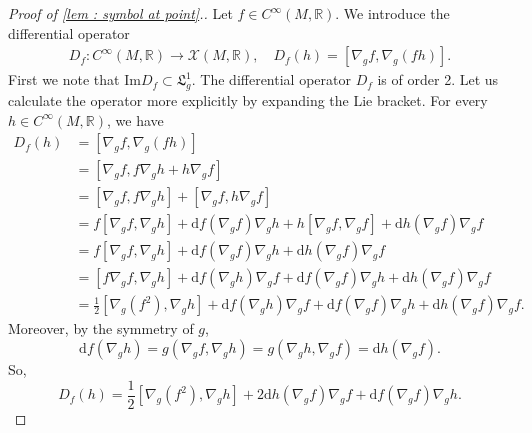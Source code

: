 \documentclass[10pt]{article}
\newcommand{\R}{{\mathbb R}}
\newcommand{\Chi}{{\mathcal X}}
\newcommand{\LL}{{\mathfrak L}}
\begin{document}
\begin{proof}[Proof of \cref{lem : symbol at point}.]
    Let $f\in C^{\infty}(M,\R)$. We introduce the differential operator
    \begin{equation*}\begin{aligned}
            D_f : C^{\infty}(M,\R)\rightarrow \Chi(M,\R),\quad D_f( h) =[\nabla_g f,\nabla_g(fh)].
        \end{aligned}\end{equation*}
    First we note that $\mathrm{Im}D_f \subset \LL^1_g$. The differential operator $D_f$ is of order 2. Let us calculate the operator more explicitly by expanding the Lie bracket.
    For every $h\in C^{\infty}(M,\R)$, we have
    \begin{align*}
        D_f(h) & =[\nabla_gf,\nabla_g(fh)]                                                                                      \\
               & =[\nabla_gf,f\nabla_gh+h\nabla_gf]                                                                             \\
               & =[\nabla_g f,f\nabla_gh]+[\nabla_gf,h\nabla_gf]                                                                \\
               & =f[\nabla_g f,\nabla_gh]+\mathrm{d}f(\nabla_gf)\nabla_gh+h[\nabla_g f,\nabla_g f]+\mathrm{d}h(\nabla_g f)\nabla_g f              \\
               & =f[\nabla_g f,\nabla_gh]+\mathrm{d}f(\nabla_gf)\nabla_gh+\mathrm{d}h(\nabla_g f)\nabla_g f                                       \\
               & =[f\nabla_gf,\nabla_gh]+\mathrm{d}f(\nabla_gh)\nabla_gf+\mathrm{d}f(\nabla_gf)\nabla_gh+\mathrm{d}h(\nabla_g f)\nabla_g f                 \\
               & =\frac{1}{2}[\nabla_g(f^2),\nabla_g h]+\mathrm{d}f(\nabla_gh)\nabla_gf+\mathrm{d}f(\nabla_gf)\nabla_gh+\mathrm{d}h(\nabla_g f)\nabla_g f.
    \end{align*}
    Moreover, by the symmetry of $g$,
    \begin{equation*}
        \mathrm{d}f(\nabla_gh)=g(\nabla_gf,\nabla_gh)=g(\nabla_gh,\nabla_g f)=\mathrm{d}h(\nabla_gf).
    \end{equation*}
    So,
    \begin{equation*}
        D_f(h)=\frac{1}{2}[\nabla_g(f^2),\nabla_gh]+2\mathrm{d}h(\nabla_gf)\nabla_gf+\mathrm{d}f(\nabla_g f)\nabla_gh.
    \end{equation*}


\end{proof}
\end{document}
